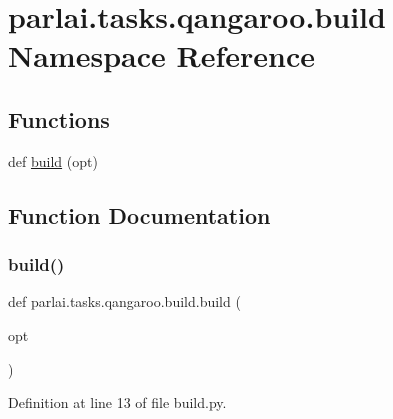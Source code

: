 \hypertarget{namespaceparlai_1_1tasks_1_1qangaroo_1_1build}{}\section{parlai.\+tasks.\+qangaroo.\+build Namespace Reference}
\label{namespaceparlai_1_1tasks_1_1qangaroo_1_1build}
\subsection*{Functions}
\begin{DoxyCompactItemize}
\item 
def \hyperlink{namespaceparlai_1_1tasks_1_1qangaroo_1_1build_a589f782a002790f9ff6a72dae2233368}{build} (opt)
\end{DoxyCompactItemize}


\subsection{Function Documentation}
\mbox{\label{namespaceparlai_1_1tasks_1_1qangaroo_1_1build_a589f782a002790f9ff6a72dae2233368}} 
\subsubsection{\texorpdfstring{build()}{build()}}
{\footnotesize\ttfamily def parlai.\+tasks.\+qangaroo.\+build.\+build (\begin{DoxyParamCaption}\item[{}]{opt }\end{DoxyParamCaption})}



Definition at line 13 of file build.\+py.

